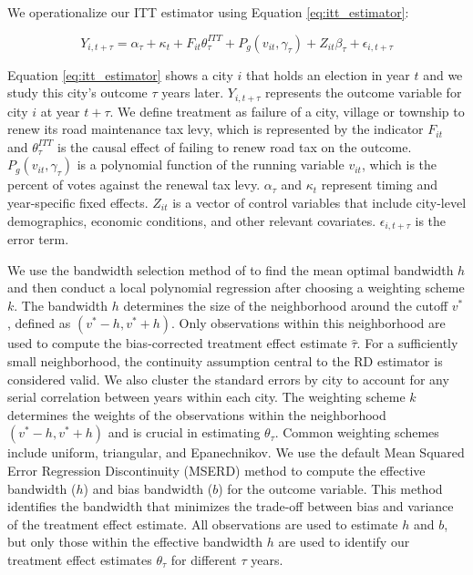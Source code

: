 We operationalize our ITT estimator using Equation \ref{eq:itt_estimator}:

\begin{equation}
Y_{i,t+\tau} = \alpha_\tau + \kappa_t + F_{it} \theta_{\tau}^{ITT} + P_g (v_{it}, \gamma_\tau) + Z_{it} \beta_\tau + \epsilon_{i,t + \tau}
\label{eq:itt_estimator}
\end{equation}

\noindent Equation \ref{eq:itt_estimator} shows a city $i$ that holds an election in year $t$ and we study this city's outcome $\tau$ years later. $Y_{i,t+\tau}$ represents the outcome variable for city $i$ at year $t + \tau$. We define treatment as failure of a city, village or township to renew its road maintenance tax levy, which is represented by the indicator $F_{it}$ and $\theta_{\tau}^{ITT}$ is the causal effect of failing to renew road tax on the outcome. $P_g (v_{it}, \gamma_\tau)$ is a polynomial function of the running variable $v_{it}$, which is the percent of votes against the renewal tax levy. $\alpha_\tau$ and $\kappa_t$ represent timing and year-specific fixed effects. $Z_{it}$ is a vector of control variables that include city-level demographics, economic conditions, and other relevant covariates. $\epsilon_{i,t + \tau}$ is the error term.

We use the bandwidth selection method of \cite{calonico2019regression} to find the mean optimal bandwidth $h$ and then conduct a local polynomial regression after choosing a weighting scheme $k$. The bandwidth $h$ determines the size of the neighborhood around the cutoff $v^*$, defined as $(v^* - h, v^* + h)$. Only observations within this neighborhood are used to compute the bias-corrected treatment effect estimate $\hat{\tau}$. For a sufficiently small neighborhood, the continuity assumption central to the RD estimator is considered valid. We also cluster the standard errors by city to account for any serial correlation between years within each city. The weighting scheme $k$ determines the weights of the observations within the neighborhood $(v^* - h, v^* + h)$ and is crucial in estimating $\theta_{\tau}$. Common weighting schemes include uniform, triangular, and Epanechnikov. We use the default Mean Squared Error Regression Discontinuity (MSERD) method to compute the effective bandwidth ($h$) and bias bandwidth ($b$) for the outcome variable. This method identifies the bandwidth that minimizes the trade-off between bias and variance of the treatment effect estimate. All observations are used to estimate $h$ and $b$, but only those within the effective bandwidth $h$ are used to identify our treatment effect estimates $\theta_\tau$ for different $\tau$ years.

